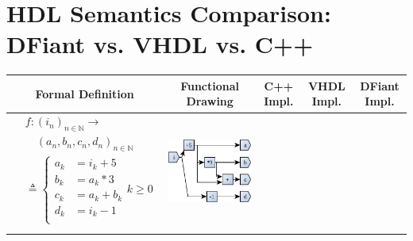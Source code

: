 
\chapter{HDL Semantics Comparison: DFiant vs. VHDL vs. C++}
\label{chap:DFiant}
\begin{table}[t]
  \centering
  \label{tbl:DataSchedDefImpl}
	\begin{threeparttable}
		\setlength\tabcolsep{2pt}
    \scriptsize
		\begin{tabular}{|c|c|c|c|c|}
			\hline 
			\textbf{Formal Definition} & \textbf{Functional Drawing} & \textbf{C++ Impl.}\tnote{†} & \textbf{VHDL Impl.\tnote{‡}} & \textbf{DFiant Impl.} \\ 
			\hline
			\begin{minipage}[b]{0.23\textwidth}
				{\fontsize{7}{8}\selectfont
					\begin{equation}    
					\nonumber
					\begin{aligned}
					&f:(i_{n})_{n\in \mathbb{N}}\rightarrow \\
          &\quad(a_n,b_n,c_n,d_n)_{n\in \mathbb{N}}\\ 
					&\triangleq\left\{
					\begin{split}
					a_k & = i_k + 5 \\
					b_k & = a_k * 3 \\
					c_k & = a_k + b_k \\
					d_k & = i_k - 1 \\
					\end{split}\right.k\geq 0 \\
					\end{aligned}
					\end{equation}
				}
			\end{minipage}
			&
			\begin{minipage}[b][3.1cm][c]{0.19\textwidth}
				\includegraphics[width=\textwidth]{graphics/fFuncDraw.pdf}

\end{minipage}
\end{tabular}
\end{threeparttable}
\end{table}
